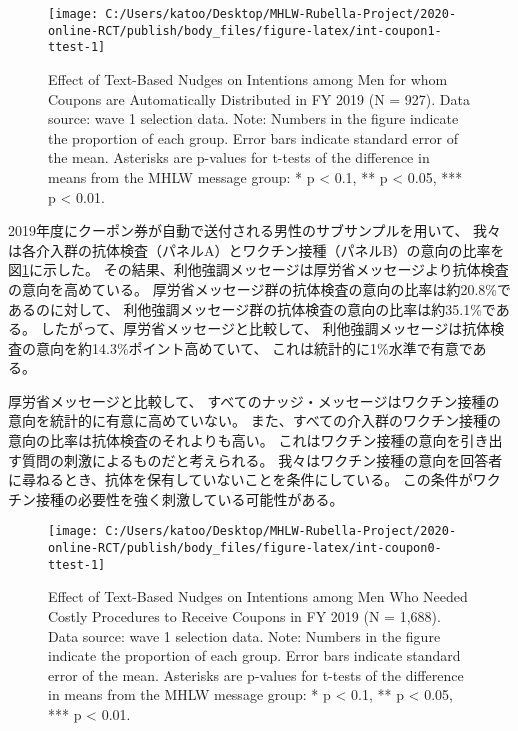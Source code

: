 \documentclass[
  11pt,
  a4paper,
]{article}
\begin{document}
\begin{figure}[t]
\texttt{[image: C:/Users/katoo/Desktop/MHLW-Rubella-Project/2020-online-RCT/publish/body\_files/figure-latex/int-coupon1-ttest-1]} \caption{Effect of Text-Based Nudges on Intentions among Men for whom Coupons are Automatically Distributed in FY 2019 (N = 927). Data source: wave 1 selection data. Note: Numbers in the figure indicate the proportion of each group. Error bars indicate standard error of the mean. Asterisks are p-values for t-tests of the difference in means from the MHLW message group: * p < 0.1, ** p < 0.05, *** p < 0.01.}\label{fig:int-coupon1-ttest}
\end{figure}

2019年度にクーポン券が自動で送付される男性のサブサンプルを用いて、
我々は各介入群の抗体検査（パネルA）とワクチン接種（パネルB）の意向の比率を
図\ref{fig:int-coupon1-ttest}に示した。
その結果、利他強調メッセージは厚労省メッセージより抗体検査の意向を高めている。
厚労省メッセージ群の抗体検査の意向の比率は約20.8\%であるのに対して、
利他強調メッセージ群の抗体検査の意向の比率は約35.1\%である。
したがって、厚労省メッセージと比較して、
利他強調メッセージは抗体検査の意向を約14.3\%ポイント高めていて、
これは統計的に1\%水準で有意である。

厚労省メッセージと比較して、
すべてのナッジ・メッセージはワクチン接種の意向を統計的に有意に高めていない。
また、すべての介入群のワクチン接種の意向の比率は抗体検査のそれよりも高い。
これはワクチン接種の意向を引き出す質問の刺激によるものだと考えられる。
我々はワクチン接種の意向を回答者に尋ねるとき、抗体を保有していないことを条件にしている。
この条件がワクチン接種の必要性を強く刺激している可能性がある。

\begin{figure}[t]
\texttt{[image: C:/Users/katoo/Desktop/MHLW-Rubella-Project/2020-online-RCT/publish/body\_files/figure-latex/int-coupon0-ttest-1]} \caption{Effect of Text-Based Nudges on Intentions among Men Who Needed Costly Procedures to Receive Coupons in FY 2019 (N = 1,688). Data source: wave 1 selection data. Note: Numbers in the figure indicate the proportion of each group. Error bars indicate standard error of the mean. Asterisks are p-values for t-tests of the difference in means from the MHLW message group: * p < 0.1, ** p < 0.05, *** p < 0.01.}\label{fig:int-coupon0-ttest}
\end{figure}
\end{document}
